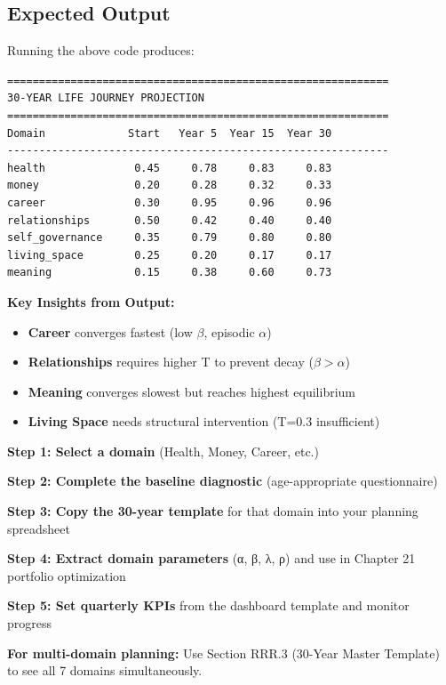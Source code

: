 \subsection{Expected Output}

Running the above code produces:

\begin{verbatim}
============================================================
30-YEAR LIFE JOURNEY PROJECTION
============================================================
Domain             Start   Year 5  Year 15  Year 30
------------------------------------------------------------
health              0.45     0.78     0.83     0.83
money               0.20     0.28     0.32     0.33
career              0.30     0.95     0.96     0.96
relationships       0.50     0.42     0.40     0.40
self_governance     0.35     0.79     0.80     0.80
living_space        0.25     0.20     0.17     0.17
meaning             0.15     0.38     0.60     0.73
\end{verbatim}

\textbf{Key Insights from Output:}
\begin{itemize}[nosep]
\item \textbf{Career} converges fastest (low $\beta$, episodic $\alpha$)
\item \textbf{Relationships} requires higher T to prevent decay ($\beta > \alpha$)
\item \textbf{Meaning} converges slowest but reaches highest equilibrium
\item \textbf{Living Space} needs structural intervention (T=0.3 insufficient)
\end{itemize}


\vspace{1cm}

\begin{tcolorbox}[colback=green!5!white, colframe=green!75!black, title=How to Use This Appendix]

\textbf{Step 1: Select a domain} (Health, Money, Career, etc.)

\textbf{Step 2: Complete the baseline diagnostic} (age-appropriate questionnaire)

\textbf{Step 3: Copy the 30-year template} for that domain into your planning spreadsheet

\textbf{Step 4: Extract domain parameters} (α, β, λ, ρ) and use in Chapter 21 portfolio optimization

\textbf{Step 5: Set quarterly KPIs} from the dashboard template and monitor progress

\textbf{For multi-domain planning:} Use Section RRR.3 (30-Year Master Template) to see all 7 domains simultaneously.

\end{tcolorbox}


